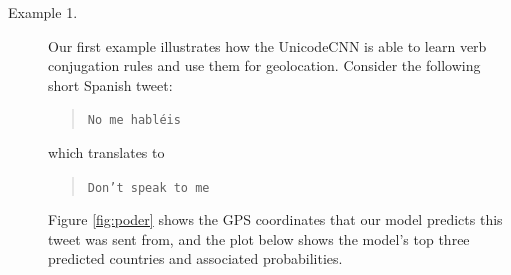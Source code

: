 \documentclass[sigconf,10pt]{acmart}
\newcommand{\str}[1]{\texttt{#1}}
\begin{document}

\begin{description}
\item[Example 1.]
    Our first example illustrates how the UnicodeCNN is able to learn verb conjugation rules and use them for geolocation.
    Consider the following short Spanish tweet:%
    \begin{quote}
        \str{No me habl\'eis}
    \end{quote}
    which translates to
    \begin{quote}
        \str{Don't speak to me}
    \end{quote}
Figure \ref{fig:poder} shows the GPS coordinates that our model predicts this tweet was sent from,
and the plot below shows the model's top three predicted countries and associated probabilities.

\noindent


\begin{figure}


\end{figure}
\end{description}
\end{document}
